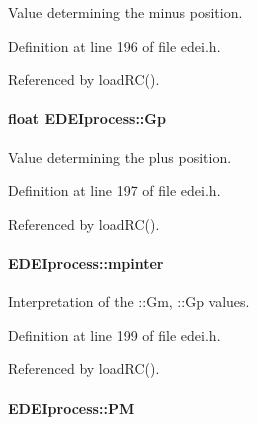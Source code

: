 Value determining the minus position. 



Definition at line 196 of file edei.h.



Referenced by loadRC().

\hypertarget{classEDEIprocess_aef4917e24c6b7a3af7b97a9b37c890b8}{
\paragraph[{Gp}]{\setlength{\rightskip}{0pt plus 5cm}float {\bf EDEIprocess::Gp}}\hfill}
\label{classEDEIprocess_aef4917e24c6b7a3af7b97a9b37c890b8}


Value determining the plus position. 



Definition at line 197 of file edei.h.



Referenced by loadRC().

\hypertarget{classEDEIprocess_a1de13d8e88dc94c8627098298bc87667}{
\paragraph[{mpinter}]{ {\bf EDEIprocess::mpinter}}\hfill}
\label{classEDEIprocess_a1de13d8e88dc94c8627098298bc87667}


Interpretation of the ::Gm, ::Gp values. 



Definition at line 199 of file edei.h.



Referenced by loadRC().

\hypertarget{classEDEIprocess_a8ed9fc30cd4798e0a90aac2c20e621ec}{
\paragraph[{PM}]{ {\bf EDEIprocess::PM}}\hfill}
\label{classEDEIprocess_a8ed9fc30cd4798e0a90aac2c20e621ec}



